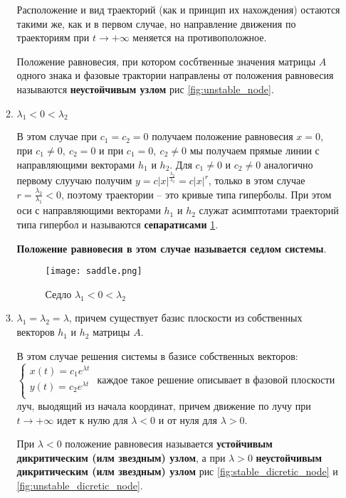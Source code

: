 \begin{enumerate}
\begin{enumerate}
    Расположение и вид траекторий (как и принцип их нахождения) остаются такими же, как и в первом случае, но направление движения по траекториям при $t \rightarrow + \infty$ меняется на противоположное.

    \begin{definition}
      Положение равновесия, при котором сосбтвенные значения матрицы $A$ одного знака и фазовые трактории направлены от положения равновесия называются \textbf{неустойчивым узлом} рис \ref{fig:unstable_node}.
    \end{definition}

    \item $\lambda_1 < 0 < \lambda_2$
    
    В этом случае при $c_1 = c_2 = 0$ получаем положение равновесия $x = 0$, при $c_1 \neq 0, ~ c_2 = 0$ и при $c_1 = 0, ~ c_2 \neq 0$ мы получаем прямые линии с направляющими векторами $h_1$ и $h_2$. Для $c_1 \neq 0$ и $c_2 \neq 0$ аналогично первому слуучаю получим $\displaystyle y = c |x|^{\frac{\lambda_2}{\lambda_2}} = c |x|^r$, только в этом случае $\displaystyle r = \frac{\lambda_2}{\lambda_1} < 0$, поэтому траектории -- это кривые типа гиперболы. При этом оси с направляющими векторами $h_1$ и $h_2$ служат асимптотами траекторий типа гипербол и называются \textbf{сепаратисами} \ref{fig:saddle}.

    \textbf{Положение равновесия в этом случае называется седлом системы}.

    \begin{figure}[h!]
      \centering
      \texttt{[image: saddle.png]}
      \caption{Седло $\lambda_1 < 0 < \lambda_2$}
      \label{fig:saddle}
    \end{figure}

    \item $\lambda_1 = \lambda_2 = \lambda$, причем существует базис плоскости из собственных векторов $h_1$ и $h_2$ матрицы $A$.
    
    В этом случае решения системы в базисе собственных векторов:
    $\begin{cases}
      x(t) = c_1 e^{\lambda t} \\
      y(t) = c_2 e^{\lambda t} \\
    \end{cases}$
    каждое такое решение описывает в фазовой плоскости луч, выодящий из начала координат, причем движение по лучу при $t \rightarrow + \infty$ идет к нулю для $\lambda < 0$ и от нуля для $\lambda > 0$.

    При $\lambda < 0$ положение равновесия называется \textbf{устойчивым дикритическим (илм звездным) узлом}, а при $\lambda > 0$ \textbf{неустойчивым дикритическим (илм звездным) узлом} рис \ref{fig:stable_dicretic_node} и \ref{fig:unstable_dicretic_node}.


\end{enumerate}
\end{enumerate}
